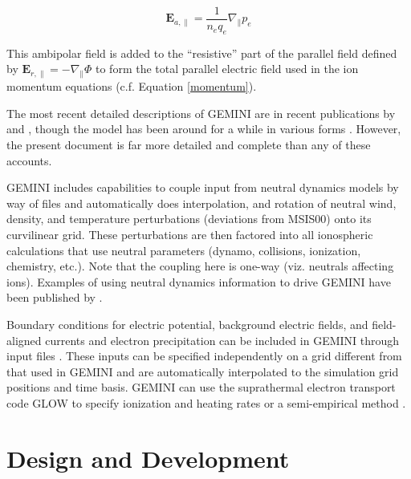 \documentclass[11pt,letterpaper]{article}
\begin{document}
\begin{linenomath*} \begin{equation}
\mathbf{E}_{a,\parallel} = \frac{1}{n_e q_e} \nabla_\parallel p_e \label{ambipolar}
\end{equation} \end{linenomath*}
This ambipolar field is added to the ``resistive'' part of the parallel field defined by $\mathbf{E}_{r,\parallel} = - \nabla_\parallel \Phi$ to form the total parallel electric field used in the ion momentum equations (c.f. Equation \ref{momentum}).  

The most recent detailed descriptions of GEMINI are in recent publications by \citet[][Appendix A]{Zettergren:2015} and \citet{Zettergren:2015b}, though the model has been around for a while in various forms \citep[e.g.][]{Zettergren:2012}.  However, the present document is far more detailed and complete than any of these accounts.    

GEMINI includes capabilities to couple input from neutral dynamics models by way of files and automatically does interpolation, and rotation of neutral wind, density, and temperature perturbations (deviations from MSIS00) onto its curvilinear grid.  These perturbations are then factored into all ionospheric calculations that use neutral parameters (dynamo, collisions, ionization, chemistry, etc.).  Note that the coupling here is one-way (viz. neutrals affecting ions).  Examples of using neutral dynamics information to drive GEMINI have been published by \citet{Zettergren:2013,Zettergren:2015,Zettergren:2017}.  

Boundary conditions for electric potential, background electric fields, and field-aligned currents and electron precipitation can be included in GEMINI through input files \citep{Zettergren:2014,Clayton:2021}.  These inputs can be specified independently on a grid different from that used in GEMINI and are automatically interpolated to the simulation grid positions and time basis.  GEMINI can use the suprathermal electron transport code GLOW to specify ionization and heating rates  \citep{Diaz:2021} or a semi-empirical method \citet{Fang:2008,Swartz:1972}.  %


\section{Design and Development}
\end{document}
